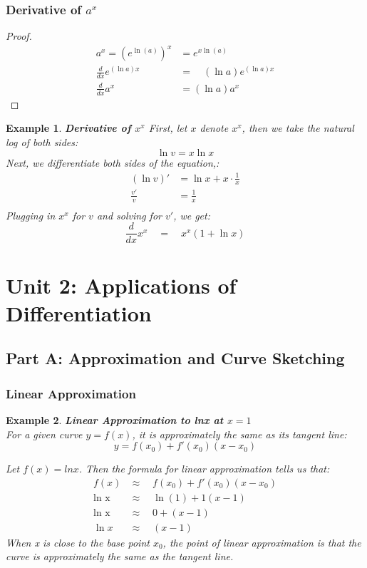 \documentclass[10pt, a4paper]{article}
\newtheorem{example}{Example}
\begin{document}
\subsubsection*{Derivative of $a^x$}
\begin{proof}
    \begin{align*}
        a^x=\left(e^{\ln(a)}\right)^x &=e^{x\ln(a)} \\
        \frac d{dx}e^{(\ln a)x}\quad &=\quad(\ln a)e^{(\ln a)x} \\
        \frac d{dx}a^x &=(\ln a)a^x
    \end{align*}

\end{proof}

\begin{example}
    \textbf{Derivative of $x^x$}
    First, let $x$ denote $x^x$, then we take the natural log of both sides:
    \[\ln v = x\ln x\]
    Next, we differentiate both sides of the equation,:
    \begin{align*}
        (\ln v)' &= \ln x + x\cdot\frac{1}{x} \\
        \frac{v'}{v} &= \frac{1}{x} \\  
    \end{align*}
    Plugging in $x^x$ for $v$ and solving for $v'$, we get:
    \[\frac d{dx}x^x\quad=\quad x^x(1+\ln x)\]
\end{example}
    
\section*{Unit 2: Applications of Differentiation}
\subsection*{Part A: Approximation and Curve Sketching}
\subsubsection*{Linear Approximation}
\begin{example}
    \textbf{Linear Approximation to lnx at $x=1$} \\
    For a given curve \(y = f(x)\), it is approximately the same as its tangent line:
    \[ \boxed{y = f(x_0) + f'(x_0)(x - x_0)} \]
    
    Let $f(x) = lnx$. Then the formula for linear approximation tells us that:
    \begin{align*}
        f(x)& \approx\quad f(x_0)+f'(x_0)(x-x_0) \\
       \text{ln x} &\approx\quad\ln(1)+1(x-1)  \\
        \text{ln x} &\approx\quad0+(x-1)  \\
        \operatorname{ln}x &\approx\quad(x-1) 
    \end{align*}
    When x is close to the base point $x_0$, the point of linear approximation is that the curve is
    approximately the same as the tangent line.
\end{example}
\end{document}
